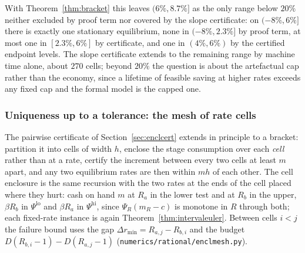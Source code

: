 With Theorem~\ref{thm:bracket} this leaves $(6\%,8.7\%]$ as the only range below $20\%$ neither
excluded by proof term nor covered by the slope certificate: on $(-8\%,6\%]$ there is exactly one
stationary equilibrium, none in $(-8\%,2.3\%]$ by proof term, at most one in $[2.3\%,6\%]$ by
certificate, and one in $(4\%,6\%)$ by the certified endpoint levels. The slope certificate
extends to the remaining range by machine time alone, about $270$ cells; beyond $20\%$ the question
is about the artefactual cap rather than the economy, since a lifetime of feasible saving at
higher rates exceeds any fixed cap and the formal model is the capped one.

\subsubsection*{Uniqueness up to a tolerance: the mesh of rate cells}\label{sec:mesh}

The pairwise certificate of Section~\ref{sec:enclcert} extends in principle to a bracket: partition
it into cells of width $h$, enclose the stage consumption over each \emph{cell} rather than at a
rate, certify the increment between every two cells at least $m$ apart, and any two equilibrium
rates are then within $mh$ of each other. The cell enclosure is the same recursion with the two
rates at the ends of the cell placed where they hurt: cash on hand $m$ at $R_a$ in the lower test
and at $R_b$ in the upper, $\beta R_b$ in $\Psi^{\mathrm{lo}}$ and $\beta R_a$ in
$\Psi^{\mathrm{hi}}$, since $\Psi_R(m_R-c)$ is monotone in $R$ through both; each fixed-rate
instance is again Theorem~\ref{thm:intervaleuler}. Between cells $i<j$ the failure bound uses the
gap $\Delta r_{\min}=R_{a,j}-R_{b,i}$ and the budget $D(R_{b,i}-1)-D(R_{a,j}-1)$
(\texttt{numerics/rational/enclmesh.py}).

